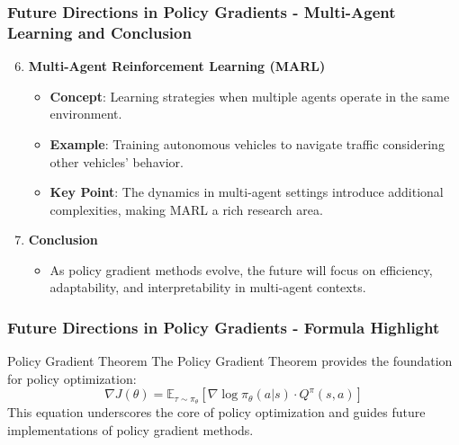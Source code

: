 \documentclass{beamer}
\begin{document}
\begin{frame}[fragile]
    \frametitle{Future Directions in Policy Gradients - Multi-Agent Learning and Conclusion}
    \begin{enumerate}
        \setcounter{enumi}{5}
        \item \textbf{Multi-Agent Reinforcement Learning (MARL)}
            \begin{itemize}
                \item \textbf{Concept}: Learning strategies when multiple agents operate in the same environment.
                \item \textbf{Example}: Training autonomous vehicles to navigate traffic considering other vehicles' behavior.
                \item \textbf{Key Point}: The dynamics in multi-agent settings introduce additional complexities, making MARL a rich research area.
            \end{itemize}
        \item \textbf{Conclusion}
            \begin{itemize}
                \item As policy gradient methods evolve, the future will focus on efficiency, adaptability, and interpretability in multi-agent contexts.
            \end{itemize}
    \end{enumerate}
\end{frame}

\begin{frame}[fragile]
    \frametitle{Future Directions in Policy Gradients - Formula Highlight}
    \begin{block}{Policy Gradient Theorem}
        The Policy Gradient Theorem provides the foundation for policy optimization:
        \begin{equation}
            \nabla J(\theta) = \mathbb{E}_{\tau \sim \pi_{\theta}} \left[ \nabla \log \pi_{\theta}(a | s) \cdot Q^{\pi}(s, a) \right]
        \end{equation}
        This equation underscores the core of policy optimization and guides future implementations of policy gradient methods.
    \end{block}
\end{frame}
\end{document}
